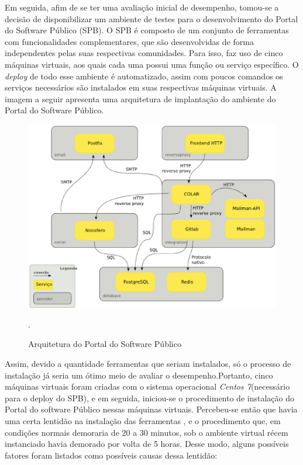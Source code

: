 Em seguida, afim de se ter uma avaliação inicial de desempenho, tomou-se a decisão de disponibilizar um ambiente de testes para o desenvolvimento do Portal do Software Público (SPB). O SPB é composto de um conjunto de ferramentas com funcionalidades complementares, que são desenvolvidas de forma independentes pelas suas respectivas comunidades\cite{softwarepublico}. Para isso, faz uso de cinco máquinas virtuais, aos quais cada uma possui uma função ou serviço específico. O \textit{deploy} de todo esse ambiente é automatizado, assim com poucos comandos os serviços necessários são instalados em suas respectivas máquinas virtuais. A imagem a seguir apresenta uma arquitetura de implantação do ambiente do Portal do Software Público. 
\begin{figure}[!htb]
\centering
\includegraphics [keepaspectratio=true,scale=0.60]{figuras/arquiteturaSPB.eps}
\caption{Arquitetura do Portal do Software Público}
\cite{softwarepublico}.
\label{SPB}
\end{figure}

Assim, devido a quantidade ferramentas que seriam instalados, só o processo de instalação já seria um ótimo meio de avaliar o desempenho.Portanto, cinco máquinas virtuais foram criadas com o sistema operacional \textit{Centos 7}(necessário para o deploy do SPB), e em seguida, iniciou-se o procedimento de instalação do Portal do software Público nessas máquinas virtuais. Percebeu-se então que havia uma certa lentidão na instalação das ferramentas , e o procedimento que, em condições normais demoraria de 20 a 30 minutos, sob o ambiente virtual récem instanciado havia demorado por volta de 5 horas. Desse modo, alguns possíveis fatores foram listados como possíveis causas dessa lentidão:

